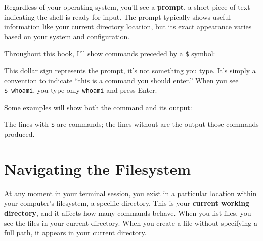 \documentclass[
  letterpaper,
  DIV=11,
  numbers=noendperiod]{scrreprt}
\newenvironment{Shaded}{\begin{snugshade}}{\end{snugshade}}
\newcommand{\ExtensionTok}[1]{\textcolor[rgb]{0.00,0.23,0.31}{#1}}
\newcommand{\NormalTok}[1]{\textcolor[rgb]{0.00,0.23,0.31}{#1}}
\begin{document}
Regardless of your operating system, you'll see a \textbf{prompt}, a
short piece of text indicating the shell is ready for input. The prompt
typically shows useful information like your current directory location,
but its exact appearance varies based on your system and configuration.

Throughout this book, I'll show commands preceded by a \texttt{\$}
symbol:

\begin{codelisting}

\caption{\texttt{terminal}}

\begin{Shaded}
\end{Shaded}

\end{codelisting}

This dollar sign represents the prompt, it's not something you type.
It's simply a convention to indicate ``this is a command you should
enter.'' When you see \texttt{\$\ whoami}, you type only \texttt{whoami}
and press Enter.

Some examples will show both the command and its output:

\begin{Shaded}
\end{Shaded}

The lines with \texttt{\$} are commands; the lines without are the
output those commands produced.

\section{Navigating the Filesystem}\label{navigating-the-filesystem}

At any moment in your terminal session, you exist in a particular
location within your computer's filesystem, a specific directory. This
is your \textbf{current working directory}, and it affects how many
commands behave. When you list files, you see the files in your current
directory. When you create a file without specifying a full path, it
appears in your current directory.
\end{document}
